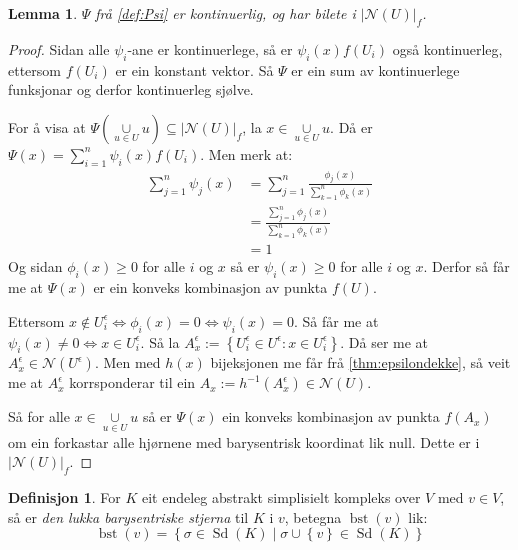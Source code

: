\documentclass[a4paper, titlepage, 12pt, norsk]{article}
\theoremstyle{plain}
\newtheorem{lemma}[theorem]{Lemma}
\theoremstyle{definition}
\newtheorem{definition}[theorem]{Definisjon}
\newcommand{\Nc}{\mathcal{N}}
\newcommand{\union}{ \mathop{\cup}\limits }
\newcommand{\gr}[1]{ \lvert #1 \rvert } %
\newcommand{\set}[1]{ \left \{ #1 \right \} } %
\newcommand{\tuple}[1]{ \left( #1 \right) } %
\DeclareMathOperator{\Sd}{Sd}
\DeclareMathOperator{\bst}{bst}
\begin{document}
\begin{lemma} \label{thm:psi-kont} %
	\( \Psi \) frå \autoref{def:Psi} er kontinuerlig, og har bilete i \( \gr{\Nc(U)}_f \).
\end{lemma}

\begin{proof} %
	Sidan alle \( \psi_i \)-ane er kontinuerlege, så er \( \psi_i(x) f(U_i) \) også kontinuerleg, ettersom \( f(U_i) \) er ein konstant vektor. Så \( \Psi \) er ein sum av kontinuerlege funksjonar og derfor kontinuerleg sjølve.

	For å visa at \( \Psi\tuple{\union_{u \in U} u} \subseteq \gr{\Nc(U)}_f \), la \( x \in \union_{u \in U} u \). Då er \( \Psi(x) = \sum_{i=1}^n \psi_i(x)f(U_i) \). Men merk at:
	\begin{align*}
		\sum_{j=1}^n \psi_j(x)  &= \sum_{j=1}^n \frac{\phi_j(x)}{\sum_{k=1}^n \phi_k(x)} \\
		&= \frac{\sum_{j=1}^n \phi_j(x)}{\sum_{k=1}^n \phi_k(x)} \\
		&= 1
	\end{align*}
	Og sidan \( \phi_i(x) \geq 0 \) for alle \( i \) og \( x \) så er \( \psi_i(x) \geq 0 \) for alle \( i \) og \( x \). Derfor så får me at \( \Psi(x) \) er ein konveks kombinasjon av punkta \( f(U) \).

	Ettersom \( x \not\in U_i^\epsilon \iff \phi_i(x) = 0 \iff \psi_i(x) = 0 \). Så får me at \( \psi_i(x) \neq 0 \iff x \in U_i^\epsilon \). Så la \( A_x^\epsilon := \set{U_i^\epsilon \in U^\epsilon : x \in U_i^\epsilon} \). Då ser me at \( A_x^\epsilon \in \Nc(U^\epsilon) \). Men med \( h(x) \) bijeksjonen me får frå \autoref{thm:epsilondekke}, så veit me at \( A_x^\epsilon \) korrsponderar til ein \( A_x := h^{-1}(A_x^\epsilon) \in \Nc(U) \).
	
	Så for alle \( x \in \union_{u \in U} u \) så er \( \Psi(x) \) ein konveks kombinasjon av punkta \( f(A_x) \) om ein forkastar alle hjørnene med barysentrisk koordinat lik null. Dette er i \( \gr{\Nc(U)}_f \).
\end{proof}

\begin{definition} \label{def:bst}
	For \( K \) eit endeleg abstrakt simplisielt kompleks over \( V \) med \( v \in V \), så er \emph{den lukka barysentriske stjerna} til \( K \) i \( v \), betegna \( \bst(v) \) lik:
	\[
		\bst(v) = \set{\sigma \in \Sd(K) \mid \sigma \union \set{v} \in \Sd(K)}
	\]
\end{definition}
\end{document}
